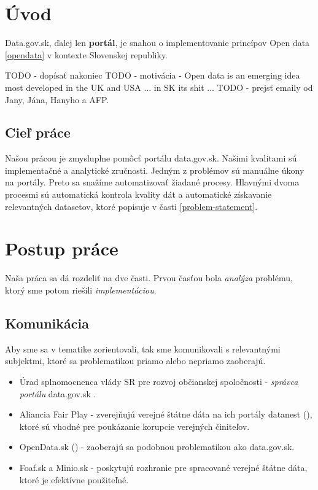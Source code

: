 \documentclass[12pt,a4paper]{article}
\begin{document}
\newpage

\section{Úvod}

Data.gov.sk, ďalej len {\bf portál}, je snahou o implementovanie princípov Open data \ref{opendata} v kontexte Slovenskej republiky. 

TODO - dopísať nakoniec 
TODO - motivácia - Open data is an emerging idea most developed in the UK and USA ... in SK its shit ... 
TODO - prejsť emaily od Jany, Jána, Hanyho a AFP. 

\subsection{Cieľ práce}
Našou prácou je zmysluplne pomôcť portálu data.gov.sk. Našimi kvalitami sú implementačné a analytické zručnosti. Jedným z problémov sú manuálne úkony na portály. Preto sa snažíme automatizovať žiadané procesy. Hlavnými dvoma procesmi sú automatická kontrola kvality dát a automatické získavanie relevantných datasetov, ktoré popisuje v časti \ref{problem-statement}. 


\section{Postup práce}
Naša práca sa dá rozdeliť na dve časti. Prvou časťou bola \emph{analýza} problému, ktorý sme potom riešili \emph{implementáciou}. 

\subsection{Komunikácia}
Aby sme sa v tematike zorientovali, tak sme komunikovali s relevantnými subjektmi, ktoré sa problematikou priamo alebo nepriamo zaoberajú. 

\begin{itemize} 
  \item Úrad splnomocnenca vlády SR pre rozvoj občianskej spoločnosti - \emph{správca portálu} data.gov.sk .
  \item Aliancia Fair Play - zverejňujú verejné štátne dáta na ich portály datanest (\cite{datanest}), ktoré sú vhodné pre poukázanie korupcie verejných činiteľov. 
  \item OpenData.sk (\cite{opendata-sk}) - zaoberajú sa podobnou problematikou ako data.gov.sk. 
  \item Foaf.sk a Minio.sk - poskytujú rozhranie pre spracované verejné štátne dáta, ktoré je efektívne použiteľné.  
\end{itemize} 
\end{document}
